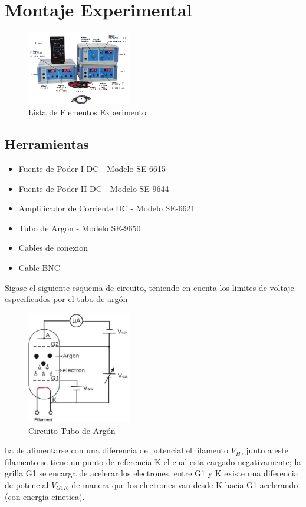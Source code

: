 \documentclass[a4paper,twocolumn,10pt]{article}
\begin{document}
\section{Montaje Experimental}
\begin{figure}[H]
    \centering
    \includegraphics[width=0.4\textwidth]{Imagenes/FranckHertz/lista_exp.png}
    \caption{Lista de Elementos Experimento}
    \label{fig:listaelementos}
\end{figure}
\subsection{Herramientas}
\begin{itemize} 
\item Fuente de Poder I DC - Modelo SE-6615
\item Fuente de Poder II DC - Modelo SE-9644
\item Amplificador de Corriente DC - Modelo SE-6621
\item Tubo de Argon - Modelo SE-9650
\item Cables de conexion 
\item Cable BNC
\end{itemize}
Sigase el siguiente esquema de circuito, teniendo en cuenta los limites de voltaje especificados por el tubo de argón
\begin{figure}[H]
    \centering
    \includegraphics[width=0.4\textwidth]{Imagenes/FranckHertz/circuit.png}
    \caption{Circuito Tubo de Argón}
    \label{fig:argoncircuiot}
\end{figure}
ha de alimentarse con una diferencia de potencial el filamento $V_H$, junto a este filamento se tiene un punto de referencia K el cual esta cargado negativamente; la grilla G1 se encarga de acelerar los electrones, entre G1 y K existe una diferencia de potencial $V_{G1K}$ de manera que los electrones van desde K hacia G1 acelerando (con energia cinetica). 
\end{document}
